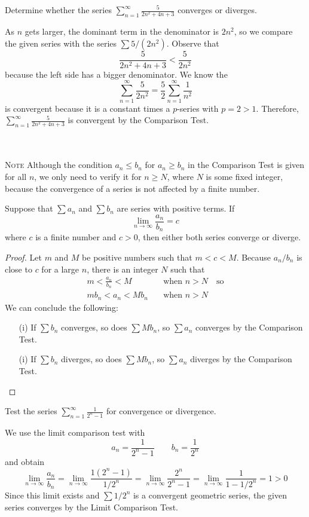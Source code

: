   \begin{example}
    Determine whether the series $\displaystyle\sum_{n=1}^{\infty} \frac{5}{2n^2 + 4n + 3}$ converges or diverges.
  \end{example}
  \begin{solution}
    As $n$ gets larger, the dominant term in the denominator is $2n^2$, so we compare the given series with the series $\sum 5/(2n^2)$. Observe that
    $$ \frac{5}{2n^2 + 4n + 3} < \frac{5}{2n^2} $$
    because the left side has a bigger denominator. We know the
    $$ \sum_{n=1}^{\infty} \frac{5}{2n^2} = \frac{5}{2} \sum_{n=1}^{\infty} \frac{1}{n^2} $$
    is convergent because it is a constant times a $p$-series with $p=2>1$. Therefore,
    $\displaystyle\sum_{n=1}^{\infty}\frac{5}{2n^2 + 4n + 3}$ is convergent by the Comparison Test.
  \end{solution}
  \hphantom{ }\\~\\
  \textsc{Note} Although the condition $a_n \leq b_n$ for $a_n \geq b_n$ in the Comparison Test is given for all $n$, we only need to verify it for $n \geq N$, where $N$ is some fixed integer, because the convergence of a series is not affected by a finite number.
  \begin{definition}
    Suppose that $\sum a_n$ and $\sum b_n$ are series with positive terms. If $$\lim_{n\to\infty}\frac{a_n}{b_n} = c $$
    where $c$ is a finite number and $c>0$, then either both series converge or diverge.
  \end{definition}
  \begin{proof}\let\qed\relax
    Let $m$ and $M$ be positive numbers such that $m<c<M$. Because $a_n/b_n$ is close to $c$ for a large $n$, there is an integer $N$ such that
    \begin{align*}
      m<\frac{a_n}{b_n}<M \quad &\text{when } n>N \quad \text{so} \\
      mb_n<a_n<Mb_n \quad &\text{when } n>N
    \end{align*}
    We can conclude the following:
    \begin{enumerate}
      \item[(i)] If $\sum b_n$ converges, so does $\sum Mb_n$, so $\sum a_n$ converges by the Comparison Test.
      \item[(i)] If $\sum b_n$ diverges, so does $\sum Mb_n$, so $\sum a_n$ diverges by the Comparison Test.
    \end{enumerate}
  \end{proof}
  \begin{example}
    Test the series $\displaystyle\sum_{n=1}^{\infty} \frac{1}{2^n -1}$ for convergence or divergence.
  \end{example}
  \begin{solution}
    We use the limit comparison test with
    $$ a_n = \frac{1}{2^n -1} \qquad b_n=\frac{1}{2^n} $$
    and obtain
    $$\lim_{n\to\infty}\frac{a_n}{b_n} = \lim_{n\to\infty}\frac{1(2^n-1)}{1/2^n} =  \lim_{n\to\infty}\frac{2^n}{2^n-1} =\lim_{n\to\infty}\frac{1}{1-1/2^n} =1>0$$Since this limit exists and $\sum 1/2^n$ is a convergent geometric series, the given series converges by the Limit Comparison Test.
  \end{solution}
